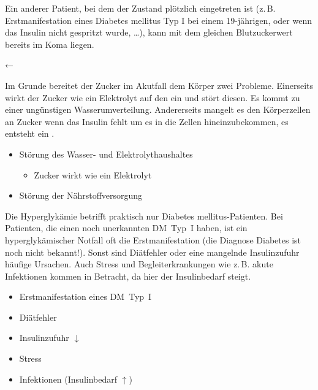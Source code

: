 {{Ein anderer Patient, bei dem der Zustand plötzlich
eingetreten ist (z.\,B. Erstmanifestation eines Diabetes
mellitus Typ I bei einem 19-jährigen, oder wenn das Insulin
nicht gespritzt wurde, \ldots), kann mit dem gleichen
Blutzuckerwert bereits im Koma liegen.

 }
{←}
{}{}{}



{
Im Grunde bereitet der Zucker im Akutfall dem Körper zwei
Probleme. Einerseits wirkt der Zucker wie ein Elektrolyt auf
den  ein und stört diesen. Es kommt
zu einer ungünstigen Wasserumverteilung. Andererseits
mangelt es den Körperzellen an Zucker wenn das Insulin fehlt
um es in die Zellen hineinzubekommen, es entsteht ein
.
}{
\begin{itemize}
  \item Störung des Wasser- und Elektrolythaushaltes
  \begin{itemize}
    \item Zucker wirkt wie ein Elektrolyt
  \end{itemize}
  \item Störung der Nährstoffversorgung
\end{itemize}
}{}{}{}


{%
Die Hyperglykämie betrifft praktisch nur Diabetes mellitus-Patienten. Bei
Patienten, die einen noch unerkannten DM~Typ~I haben, ist
ein hyperglykämischer Notfall oft die Erstmanifestation (die
Diagnose Diabetes ist noch nicht bekannt!). Sonst sind
Diätfehler oder eine mangelnde Insulinzufuhr häufige
Ursachen. Auch Stress und Begleiterkrankungen wie z.\,B.
akute Infektionen kommen in Betracht, da hier der
Insulinbedarf steigt.
}{
\begin{itemize}
  \item Erstmanifestation eines DM~Typ~I
  \item Diätfehler
  \item Insulinzufuhr $\downarrow$
  \item Stress
  \item Infektionen (Insulinbedarf ${\uparrow}$)
\end{itemize}
}{}{}{}









}
